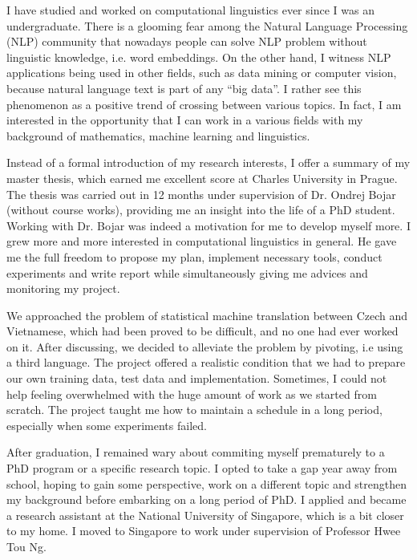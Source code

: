 \documentclass[a4paper, 12pt]{scrartcl}
\begin{document}

I have studied and worked on computational linguistics ever since I was an undergraduate. 
There is a glooming fear among the Natural Language Processing (NLP) community that nowadays people can solve NLP problem without linguistic knowledge, i.e. word embeddings.
On the other hand, I witness NLP applications being used in other fields, such as data mining or computer vision, because natural language text is part of any ``big data''. 
I rather see this phenomenon as a positive trend of crossing between various topics. 
In fact, I am interested in the opportunity that I can work in a various fields with my background of mathematics, machine learning and linguistics. 


Instead of a formal introduction of my research interests, I offer a summary of my master thesis, which earned me excellent score at Charles University in Prague. 
The thesis was carried out in 12 months under supervision of Dr. Ondrej Bojar (without course works), providing me an insight into the life of a PhD student.
Working with Dr. Bojar was indeed a motivation for me to develop myself more. I grew more and more interested in computational linguistics in general. 
He gave me the full freedom to propose my plan, implement necessary tools, conduct experiments and write report while simultaneously giving me advices and monitoring my project. 

We approached the problem of statistical machine translation between Czech and Vietnamese, which had been proved to be difficult, and no one had ever worked on it.
After discussing, we decided to alleviate the problem by pivoting, i.e using a third language. 
The project offered a realistic condition that we had to prepare our own training data, test data and implementation.
Sometimes, I could not help feeling overwhelmed with the huge amount of work as we started from scratch.
The project taught me how to maintain a schedule in a long period, especially when some experiments failed.



After graduation, I remained wary about commiting myself prematurely to a PhD program or a specific research topic. 
I opted to take a gap year away from school, hoping to gain some perspective, work on a different topic and strengthen my background before embarking on a long period of PhD.
I applied and became a research assistant at the National University of Singapore, which is a bit closer to my home.
I moved to Singapore to work under supervision of Professor Hwee Tou Ng.  
\end{document}
